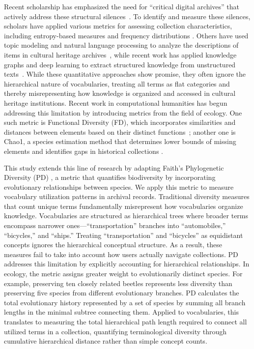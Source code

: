 \documentclass[final]{anthology-ch}
\begin{document}
Recent scholarship has emphasized the need for ``critical digital archives'' that actively address these structural silences~\cite{caswellCriticalArchivalStudies2017}. To identify and measure these silences, scholars have applied various metrics for assessing collection characteristics, including entropy-based measures and frequency distributions \cite{topazDiversityArtistsMajor2019, yangDevelopingAssessmentIndex2022, langerRiseFallBiodiversity2021, quinnMeasuringDiversityOpinion1995}. Others have used topic modeling and natural language processing to analyze the descriptions of items in cultural heritage archives~\cite{kleinExploratoryThematicAnalysis2015}, while recent work has applied knowledge graphs and deep learning to extract structured knowledge from unstructured texts~\cite{huangUsingKnowledgeGraphs2023}. 
While these quantitative approaches show promise, they often ignore the hierarchical nature of vocabularies, treating all terms as flat categories and thereby misrepresenting how knowledge is organized and accessed in cultural heritage institutions. 
%
Recent work in computational humanities has begun addressing this limitation by introducing metrics from the field of ecology. One such metric is Functional Diversity (FD), which incorporates similarities and distances between elements based on their distinct functions~\cite{karsdorpIntroducingFunctionalDiversity2022}; another one is Chao1, a species estimation method that determines lower bounds of missing elements and identifies gaps in historical collections \cite{kestemontForgottenBooksApplication2022, koeserMissingDataSpeculative2024, weversWhatShallWe2022, karsdorpRegisterDemographicModeling2024}. 

This study extends this line of research by adapting Faith's Phylogenetic Diversity (PD) \cite{faithConservationEvaluationPhylogenetic1992}, a metric that quantifies biodiversity by incorporating evolutionary relationships between species. We apply this metric to measure vocabulary utilization patterns in archival records. Traditional diversity measures that count unique terms fundamentally misrepresent how vocabularies organize knowledge. Vocabularies are structured as hierarchical trees where broader terms encompass narrower ones---``transportation'' branches into ``automobiles,'' ``bicycles,'' and ``ships.'' Treating ``transportation'' and ``bicycles'' as equidistant concepts ignores the hierarchical conceptual structure. As a result, these measures fail to take into account how users actually navigate collections. 
PD addresses this limitation by explicitly accounting for hierarchical relationships. In ecology, the metric assigns greater weight to evolutionarily distinct species. For example, preserving ten closely related beetles represents less diversity than preserving five species from different evolutionary branches. PD calculates the total evolutionary history represented by a set of species by summing all branch lengths in the minimal subtree connecting them. Applied to vocabularies, this translates to measuring the total hierarchical path length required to connect all utilized terms in a collection, quantifying terminological diversity through cumulative hierarchical distance rather than simple concept counts. 
\end{document}
